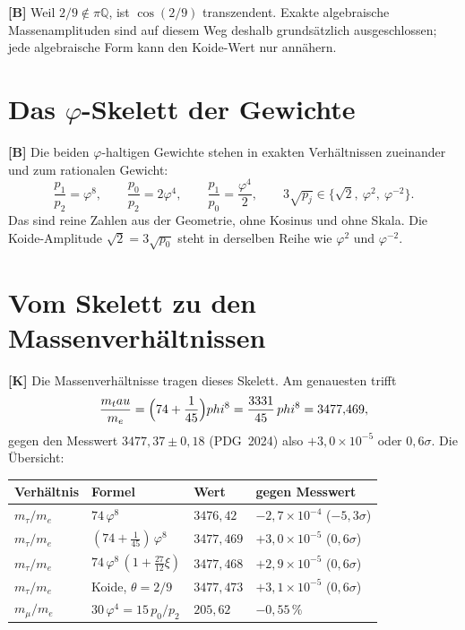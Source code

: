 \textbf{[B]} Weil $2/9\notin\pi\mathbb{Q}$, ist $\cos(2/9)$ transzendent. Exakte
algebraische Massenamplituden sind auf diesem Weg deshalb grundsätzlich
ausgeschlossen; jede algebraische Form kann den Koide-Wert nur annähern.

\section{Das $\varphi$-Skelett der Gewichte}

\textbf{[B]} Die beiden $\varphi$-haltigen Gewichte stehen in exakten Verhältnissen
zueinander und zum rationalen Gewicht:
\[
  \frac{p_1}{p_2} = \varphi^8,\qquad
  \frac{p_0}{p_2} = 2\varphi^4,\qquad
  \frac{p_1}{p_0} = \frac{\varphi^4}{2},\qquad
  3\sqrt{p_j}\in\bigl\{\sqrt2,\ \varphi^2,\ \varphi^{-2}\bigr\}.
\]
Das sind reine Zahlen aus der Geometrie, ohne Kosinus und ohne Skala. Die
Koide-Amplitude $\sqrt2=3\sqrt{p_0}$ steht in derselben Reihe wie $\varphi^2$
und $\varphi^{-2}$.

\section{Vom Skelett zu den Massenverhältnissen}

\textbf{[K]} Die Massenverhältnisse tragen dieses Skelett. Am genauesten trifft
\[
  \frac{m_\tau}{m_e} = \Bigl(74+\frac1{45}\Bigr)\varphi^8 = \frac{3331}{45}\,\varphi^8 = 3477{,}469 ,
\]
gegen den Messwert $3477{,}37\pm0{,}18$ (PDG~2024) also $+3{,}0\times10^{-5}$
oder $0{,}6\sigma$. Die Übersicht:
\begin{center}
\small
\begin{tabular}{@{}llll@{}}
\toprule
Verhältnis & Formel & Wert & gegen Messwert \\
\midrule
$m_\tau/m_e$ & $74\,\varphi^8$ & $3476{,}42$ & $-2{,}7\times10^{-4}$ ($-5{,}3\sigma$) \\
$m_\tau/m_e$ & $(74+\tfrac1{45})\,\varphi^8$ & $3477{,}469$ & $+3{,}0\times10^{-5}$ ($0{,}6\sigma$) \\
$m_\tau/m_e$ & $74\,\varphi^8\,(1+\tfrac{27}{12}\xi)$ & $3477{,}468$ & $+2{,}9\times10^{-5}$ ($0{,}6\sigma$) \\
$m_\tau/m_e$ & Koide, $\theta=2/9$ & $3477{,}473$ & $+3{,}1\times10^{-5}$ ($0{,}6\sigma$) \\
$m_\mu/m_e$ & $30\,\varphi^4 = 15\,p_0/p_2$ & $205{,}62$ & $-0{,}55\,\%$ \\
\bottomrule
\end{tabular}
\end{center}

